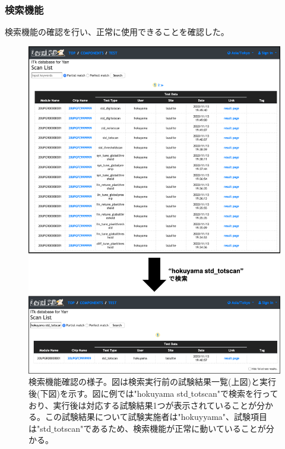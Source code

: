 \clearpage
\subsubsection{検索機能}

検索機能の確認を行い、正常に使用できることを確認した。

\begin{figure}[bpt]\centering
\includegraphics[width=12cm]{demo_search_function}
\caption[検索機能確認の様子]{検索機能確認の様子。図は検索実行前の試験結果一覧(上図)と実行後(下図)を示す。図に例では"hokuyama std$\_$totscan"で検索を行っており、実行後は対応する試験結果1つが表示されていることが分かる。この試験結果について試験実施者は"hokuyyama"、試験項目は"std$\_$totscan"であるため、検索機能が正常に動いていることが分かる。}
\label{demo_search_function}
\end{figure}

\clearpage
